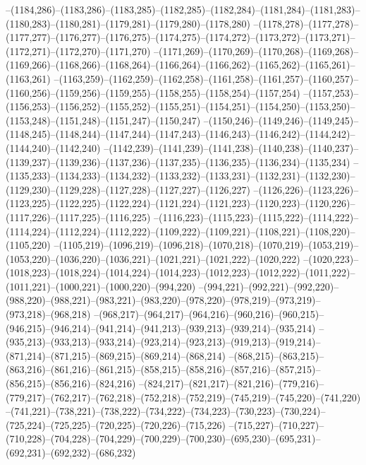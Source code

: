 --(1184,286)--(1183,286)--(1183,285)--(1182,285)--(1182,284)--(1181,284)--(1181,283)--(1180,283)--(1180,281)--(1179,281)--(1179,280)--(1178,280)
--(1178,278)--(1177,278)--(1177,277)--(1176,277)--(1176,275)--(1174,275)--(1174,272)--(1173,272)--(1173,271)--(1172,271)--(1172,270)--(1171,270)
--(1171,269)--(1170,269)--(1170,268)--(1169,268)--(1169,266)--(1168,266)--(1168,264)--(1166,264)--(1166,262)--(1165,262)--(1165,261)--(1163,261)
--(1163,259)--(1162,259)--(1162,258)--(1161,258)--(1161,257)--(1160,257)--(1160,256)--(1159,256)--(1159,255)--(1158,255)--(1158,254)--(1157,254)
--(1157,253)--(1156,253)--(1156,252)--(1155,252)--(1155,251)--(1154,251)--(1154,250)--(1153,250)--(1153,248)--(1151,248)--(1151,247)--(1150,247)
--(1150,246)--(1149,246)--(1149,245)--(1148,245)--(1148,244)--(1147,244)--(1147,243)--(1146,243)--(1146,242)--(1144,242)--(1144,240)--(1142,240)
--(1142,239)--(1141,239)--(1141,238)--(1140,238)--(1140,237)--(1139,237)--(1139,236)--(1137,236)--(1137,235)--(1136,235)--(1136,234)--(1135,234)
--(1135,233)--(1134,233)--(1134,232)--(1133,232)--(1133,231)--(1132,231)--(1132,230)--(1129,230)--(1129,228)--(1127,228)--(1127,227)--(1126,227)
--(1126,226)--(1123,226)--(1123,225)--(1122,225)--(1122,224)--(1121,224)--(1121,223)--(1120,223)--(1120,226)--(1117,226)--(1117,225)--(1116,225)
--(1116,223)--(1115,223)--(1115,222)--(1114,222)--(1114,224)--(1112,224)--(1112,222)--(1109,222)--(1109,221)--(1108,221)--(1108,220)--(1105,220)
--(1105,219)--(1096,219)--(1096,218)--(1070,218)--(1070,219)--(1053,219)--(1053,220)--(1036,220)--(1036,221)--(1021,221)--(1021,222)--(1020,222)
--(1020,223)--(1018,223)--(1018,224)--(1014,224)--(1014,223)--(1012,223)--(1012,222)--(1011,222)--(1011,221)--(1000,221)--(1000,220)--(994,220)
--(994,221)--(992,221)--(992,220)--(988,220)--(988,221)--(983,221)--(983,220)--(978,220)--(978,219)--(973,219)--(973,218)--(968,218)
--(968,217)--(964,217)--(964,216)--(960,216)--(960,215)--(946,215)--(946,214)--(941,214)--(941,213)--(939,213)--(939,214)--(935,214)
--(935,213)--(933,213)--(933,214)--(923,214)--(923,213)--(919,213)--(919,214)--(871,214)--(871,215)--(869,215)--(869,214)--(868,214)
--(868,215)--(863,215)--(863,216)--(861,216)--(861,215)--(858,215)--(858,216)--(857,216)--(857,215)--(856,215)--(856,216)--(824,216)
--(824,217)--(821,217)--(821,216)--(779,216)--(779,217)--(762,217)--(762,218)--(752,218)--(752,219)--(745,219)--(745,220)--(741,220)
--(741,221)--(738,221)--(738,222)--(734,222)--(734,223)--(730,223)--(730,224)--(725,224)--(725,225)--(720,225)--(720,226)--(715,226)
--(715,227)--(710,227)--(710,228)--(704,228)--(704,229)--(700,229)--(700,230)--(695,230)--(695,231)--(692,231)--(692,232)--(686,232)

